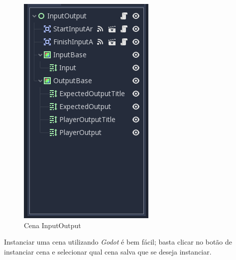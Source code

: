 \begin{minipage}{0.05\textwidth}
    \hfill
\end{minipage}%
\begin{minipage}[t]{0.4\textwidth}
    \begin{figure}[H]
        \includegraphics[width=\textwidth]{../figuras/cena_input_output.png}
        \caption{Cena InputOutput}
    \end{figure}
\end{minipage}

Instanciar uma cena utilizando \textit{Godot} é bem fácil; basta clicar no botão
de instanciar cena e selecionar qual cena salva que se deseja instanciar.
 
